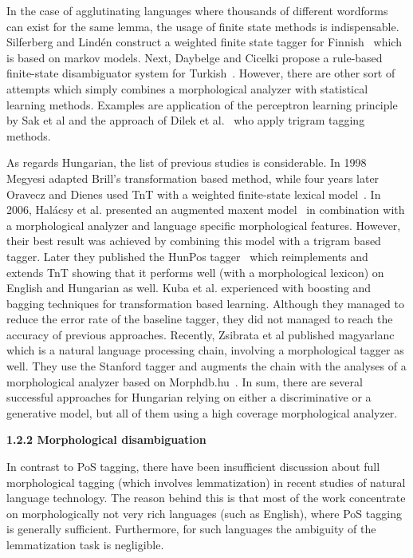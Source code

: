 In the case of agglutinating languages where thousands of different wordforms can exist for the same lemma, the usage of finite state methods is indispensable.
Silferberg and Lindén construct a weighted finite state tagger for Finnish~\cite{} which is based on markov models.
Next, Daybelge and Cicelki propose a rule-based finite-state disambiguator system for Turkish~\cite{}.
However, there are other sort of attempts which simply combines a morphological analyzer with statistical learning methods.
Examples are application of the perceptron learning principle~\cite{} by Sak et al and the approach of Dilek et al.~\cite{} who apply trigram tagging methods.

As regards Hungarian, the list of previous studies is considerable.
In 1998 Megyesi adapted Brill’s transformation based method, while four years later Oravecz and Dienes used TnT with a weighted finite-state lexical model~\cite{}.
In 2006, Halácsy et al. presented an augmented maxent model~\cite{} in combination with a morphological analyzer and language specific morphological features.
However, their best result was achieved by combining this model with a trigram based tagger.
Later they published the HunPos tagger~\cite{} which reimplements and extends TnT showing that it performs well (with a morphological lexicon) on English and Hungarian as well.
Kuba et al. experienced with boosting and bagging techniques for transformation based learning.
Although they managed to reduce the error rate of the baseline tagger, they did not managed to reach the accuracy of previous approaches.
Recently, Zsibrata et al published magyarlanc~\cite{} which is a natural language processing chain, involving a morphological tagger as well.
They use the Stanford tagger and augments the chain with the analyses of a morphological analyzer based on Morphdb.hu~\cite{}.
In sum, there are several successful approaches for Hungarian relying on either a discriminative or a generative model, but all of them using a high coverage morphological analyzer.

\textbf{1.2.2 Morphological disambiguation}

In contrast to PoS tagging, there have been insufficient discussion about full morphological tagging (which involves lemmatization) in recent studies of natural language technology.
The reason behind this is that most of the work concentrate on morphologically not very rich languages (such as English), where PoS tagging is generally sufficient.
Furthermore, for such languages the ambiguity of the lemmatization task is negligible.

